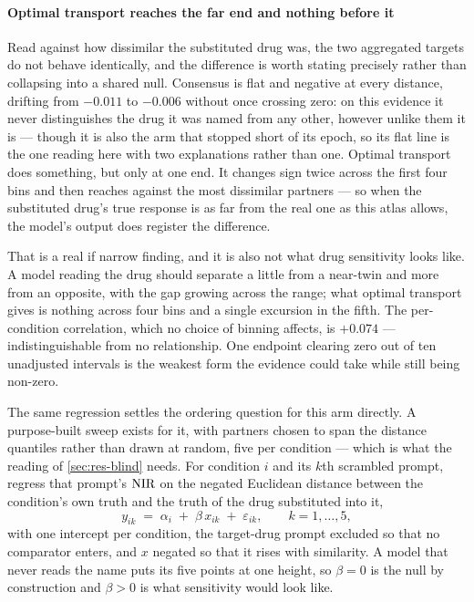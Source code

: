 \paragraph{Optimal transport reaches the far end and nothing before it} Read
against how dissimilar the substituted drug was, the two aggregated targets do
not behave identically, and the difference is worth stating precisely rather than
collapsing into a shared null. Consensus is flat and negative at every distance,
drifting from $-0.011$ to $-0.006$ without once crossing zero: on this evidence
it never distinguishes the drug it was named from any other, however unlike them
it is --- though it is also the arm that stopped short of its epoch, so its flat
line is the one reading here with two explanations rather than one. Optimal transport does something, but only at one end. It changes sign twice
across the first four bins and then reaches
 against the most dissimilar partners --- so when the
substituted drug's true response is as far from the real one as this atlas
allows, the model's output does register the difference.

That is a real if narrow finding, and it is also not what drug sensitivity looks
like. A model reading the drug should separate a little from a near-twin and more
from an opposite, with the gap growing across the range; what optimal transport
gives is nothing across four bins and a single excursion in the fifth. The
per-condition correlation, which no choice of binning affects, is $+0.074$ ---
indistinguishable from no relationship. One endpoint clearing zero out of ten
unadjusted intervals is the weakest form the evidence could take while still
being non-zero.

The same regression settles the ordering question for this arm directly. A
purpose-built sweep exists for it, with partners chosen to span the distance
quantiles rather than drawn at random, five per condition --- which is what the
reading of \cref{sec:res-blind} needs. For condition $i$ and its $k$th scrambled
prompt, regress that prompt's $\textrm{NIR}$ on the negated Euclidean distance between the
condition's own truth and the truth of the drug substituted into it,
\begin{equation}
 y_{ik} \;=\; \alpha_i \;+\; \beta\,x_{ik} \;+\; \varepsilon_{ik},
 \qquad k = 1,\dots,5,
\end{equation}
with one intercept per condition, the target-drug prompt excluded so that no
comparator enters, and $x$ negated so that it rises with similarity. A model that
never reads the name puts its five points at one height, so $\beta = 0$ is the null
by construction and $\beta > 0$ is what sensitivity would look like.

